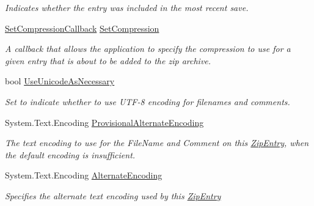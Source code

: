 \begin{DoxyCompactItemize}
\begin{DoxyCompactList}\small\item\em Indicates whether the entry was included in the most recent save. \end{DoxyCompactList}\item 
\mbox{\hyperlink{namespace_super_tiled2_unity_1_1_ionic_1_1_zip_ab6b15a72531220e6f98c46b594c9a849}{Set\+Compression\+Callback}} \mbox{\hyperlink{class_super_tiled2_unity_1_1_ionic_1_1_zip_1_1_zip_entry_aa1417136aad30c1392834ce807438d58}{Set\+Compression}}
\begin{DoxyCompactList}\small\item\em A callback that allows the application to specify the compression to use for a given entry that is about to be added to the zip archive. \end{DoxyCompactList}\item 
bool \mbox{\hyperlink{class_super_tiled2_unity_1_1_ionic_1_1_zip_1_1_zip_entry_a18a1d0cdb8d149e3be733736c8bef63c}{Use\+Unicode\+As\+Necessary}}
\begin{DoxyCompactList}\small\item\em Set to indicate whether to use U\+T\+F-\/8 encoding for filenames and comments. \end{DoxyCompactList}\item 
System.\+Text.\+Encoding \mbox{\hyperlink{class_super_tiled2_unity_1_1_ionic_1_1_zip_1_1_zip_entry_a29b5aae0611b60d5906ab25a1ed6c2f1}{Provisional\+Alternate\+Encoding}}
\begin{DoxyCompactList}\small\item\em The text encoding to use for the File\+Name and Comment on this \mbox{\hyperlink{class_super_tiled2_unity_1_1_ionic_1_1_zip_1_1_zip_entry}{Zip\+Entry}}, when the default encoding is insufficient. \end{DoxyCompactList}\item 
System.\+Text.\+Encoding \mbox{\hyperlink{class_super_tiled2_unity_1_1_ionic_1_1_zip_1_1_zip_entry_a7a5ff9afc8cad1de6fbfc76a7bf786ee}{Alternate\+Encoding}}
\begin{DoxyCompactList}\small\item\em Specifies the alternate text encoding used by this \mbox{\hyperlink{class_super_tiled2_unity_1_1_ionic_1_1_zip_1_1_zip_entry}{Zip\+Entry}} \end{DoxyCompactList}\item 

\end{DoxyCompactItemize}
